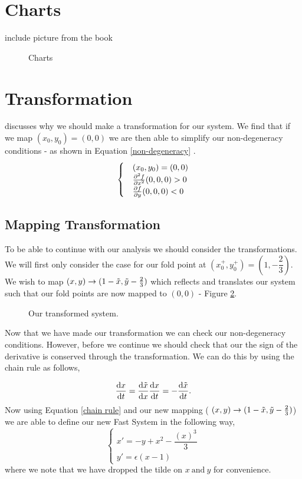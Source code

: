 \documentclass{article}
\newcommand{\folds}{(x_0,y_0)}
\newcommand{\st}{such that }
\begin{document}
\section{Charts}\label{sec: charts}
include picture from the book \begin{figure}[h!]
    \centering
    \caption{Charts}
    \label{fig: charts}
\end{figure}
\section{Transformation}
\citet{krupa2001} discusses why we should make a transformation for our system. We find that if we map $\folds=(0,0)$ we are then able to simplify our non-degeneracy conditions - as shown in Equation \ref{non-degeneracy} \citep{krupa2001}.
\begin{equation}
    \begin{cases}
        &\folds=(0,0)\\
        &\pd{^2f}{x^2}(0,0,0)>0\\
        &\pd{f}{y}(0,0,0)<0
    \end{cases} 
    \label{non-degeneracy}
\end{equation}

\subsection{Mapping Transformation}\label{sex: mapping}
To be able to continue with our analysis we should consider the transformations. We will first only consider the case for our fold point at $(x_0^+,y_0^+)=(1,-\dfrac{2}{3})$. We wish to map $(x,y)\to (1-\Tilde{x},\Tilde{y}-\frac{2}{3})$ which reflects and translates our system \st our fold points are now mapped to $(0,0)$ - Figure \ref{fig: Transformed System}. 

\begin{figure}[h]
    \centering
    \caption{Our transformed system.}
    \label{fig: Transformed System}
\end{figure}
Now that we have made our transformation we can check our non-degeneracy conditions. However, before we continue we should check that our the sign of the derivative is conserved through the transformation. We can do this by using the chain rule as follows, 

\begin{equation}
    \od{x}{t}=\od{\Tilde{x}}{x}\od{x}{t}=-\od{\Tilde{x}}{t}. \label{chain rule}
\end{equation}
Now using Equation \ref{chain rule} and our new mapping ( $(x,y)\to (1-\Tilde{x},\Tilde{y}-\frac{2}{3})$) we are able to define our new Fast System in the following way, 
\begin{equation}
    \begin{cases}
        x'=-y+x^2-\dfrac{(x)^3}{3}\\
        y'=\epsilon(x-1)
    \end{cases}
    \label{eq: Fast System}
\end{equation}
where we note that we have dropped the tilde on $x \ \text{and} \ y$ for convenience. \\
\end{document}
